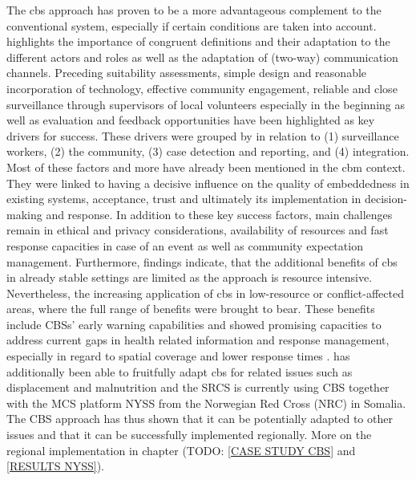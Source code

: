 {The \acrshort*{cbs} approach has proven to be a more advantageous complement to the conventional system, especially if certain conditions are taken into account. \autocite{gueninParticipatoryEpidemiologicalOne2022} highlights the importance of congruent definitions and their adaptation to the different actors and roles as well as the adaptation of (two-way) communication channels. Preceding suitability assessments, simple design and reasonable incorporation of technology, effective community engagement, reliable and close surveillance through supervisors of local volunteers especially in the beginning as well as evaluation and feedback opportunities have been highlighted as key drivers for success. These drivers were grouped by \autocite{mcgowanCommunitybasedSurveillanceInfectious2022} in relation to (1) surveillance workers, (2) the community, (3) case detection and reporting, and (4) integration. Most of these factors and more have already been mentioned in the \acrshort*{cbm} context. They were linked to having a decisive influence on the quality of embeddedness in existing systems, acceptance, trust and ultimately its implementation in decision-making and response. In addition to these key success factors, main challenges remain in ethical and privacy considerations, availability of resources and fast response capacities in case of an event as well as community expectation management. Furthermore, \autocite{boetzelaerEvaluationCommunityBased2020} findings indicate, that the additional benefits of \acrshort*{cbs} in already stable settings are limited as the approach is resource intensive. Nevertheless, the increasing application of \acrshort*{cbs} in low-resource or conflict-affected areas, where the full range of benefits were brought to bear. These benefits include CBSs' early warning capabilities and showed promising capacities to address current gaps in health related information and response management, especially in regard to spatial coverage and lower response times \autocite{metugeHumanitarianLedCommunitybased2021, ratnayakePeoplecentredSurveillanceNarrative2020}. \autocite{metugeHumanitarianLedCommunitybased2021} has additionally been able to fruitfully adapt \acrshort*{cbs} for related issues such as displacement and malnutrition and the SRCS is currently using CBS together with the MCS platform NYSS from the Norwegian Red Cross (NRC) in Somalia. The CBS approach has thus shown that it can be potentially adapted to other issues and that it can be successfully implemented regionally. More on the regional implementation in chapter (TODO: \ref*{CASE STUDY CBS} and \ref*{RESULTS NYSS}).

}
